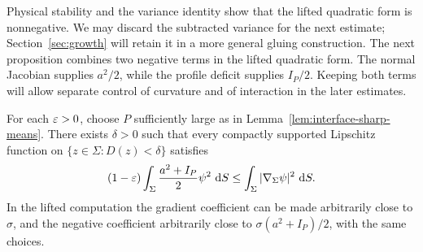 Physical stability and the variance identity show that the lifted
quadratic form is nonnegative.  We may discard the subtracted variance
for the next estimate; Section~\ref{sec:growth} will retain it in a
more general gluing construction.  The next proposition combines two
negative terms in the lifted quadratic form.  The normal Jacobian
supplies $a^2/2$, while the profile deficit
supplies $I_P/2$.  Keeping both terms will allow separate control of
curvature and of interaction in the later estimates.

\begin{proposition}
\label{prop:interface-strengthened-stability}
For each $\varepsilon>0$, choose $P$ sufficiently large as in
Lemma~\ref{lem:interface-sharp-means}.  There exists $\delta>0$
such that every compactly supported Lipschitz function on
$\{z\in\Sigma: D(z)<\delta\}$ satisfies
\begin{equation}\label{eq:L3}
 (1-\varepsilon)\int_\Sigma\frac{a^2+I_P}{2}\psi^2\,\,\mathrm d S
 \le\int_\Sigma|\nabla_\Sigma\psi|^2\,\,\mathrm d S.
\end{equation}
In the lifted computation the gradient coefficient can be made
arbitrarily close to $\sigma$, and the negative coefficient
arbitrarily close to $\sigma(a^2+I_P)/2$, with the same choices.
\end{proposition}

